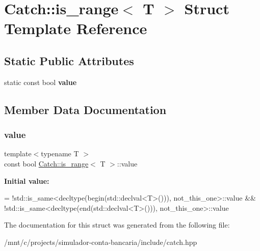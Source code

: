 \hypertarget{structCatch_1_1is__range}{}\section{Catch\+:\+:is\+\_\+range$<$ T $>$ Struct Template Reference}
\label{structCatch_1_1is__range}
\subsection*{Static Public Attributes}
\begin{DoxyCompactItemize}
\item 
static const bool {\bfseries value}
\end{DoxyCompactItemize}


\subsection{Member Data Documentation}
\mbox{\label{structCatch_1_1is__range_afaec39e819c3956829cbbd00feba11be}} 
\subsubsection{\texorpdfstring{value}{value}}
{\footnotesize\ttfamily template$<$typename T $>$ \\
const bool \hyperlink{structCatch_1_1is__range}{Catch\+::is\+\_\+range}$<$ T $>$\+::value\hspace{0.3cm}{\ttfamily [static]}}

{\bfseries Initial value\+:}
\begin{DoxyCode}
=
            !std::is\_same<decltype(begin(std::declval<T>())), not\_this\_one>::value &&
            !std::is\_same<decltype(end(std::declval<T>())), not\_this\_one>::value
\end{DoxyCode}


The documentation for this struct was generated from the following file\+:\begin{DoxyCompactItemize}
\item 
/mnt/c/projects/simulador-\/conta-\/bancaria/include/catch.\+hpp\end{DoxyCompactItemize}

